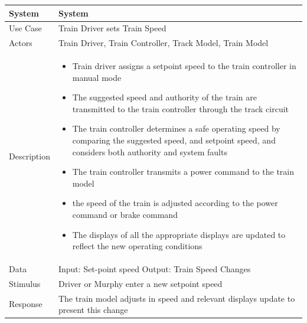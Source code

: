 \documentclass{article}
\begin{document}
    \begin{longtable}{
    || >{\raggedright\arraybackslash}m{}
    | >{\raggedright\arraybackslash}m{}||}
    \hline
    \textbf{System} & \textbf{System} \\
    \hline
    Use Case & Train Driver sets Train Speed \\
    \hline
    Actors & Train Driver, Train Controller, Track Model, Train Model\\
    \hline
    Description & \begin{itemize}
        \item Train driver assigns a setpoint speed to the train controller in manual mode
        \item The suggested speed and authority of the train are transmitted to the train controller through the track circuit
        \item The train controller determines a safe operating speed by comparing the suggested speed, and setpoint speed, and considers both authority and system faults
        \item The train controller transmits a power command to the train model
        \item the speed of the train is adjusted according to the power command or brake command
        \item The displays of all the appropriate displays are updated to reflect the new operating conditions
    \end{itemize}\\
    \hline
    Data & Input: Set-point speed \newline Output: Train Speed Changes \\
    \hline
    Stimulus & Driver or Murphy enter a new setpoint speed\\
    \hline
    Response & The train model adjusts in speed and relevant displays update to present this change\\
    \hline
    \end{longtable}
    
    
    
\end{document}
